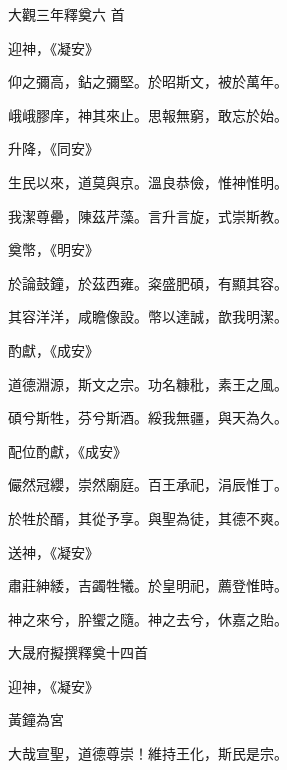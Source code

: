 \begin{pinyinscope}
 大觀三年釋奠六
 首



 迎神，《凝安》



 仰之彌高，鉆之彌堅。於昭斯文，被於萬年。



 峨峨膠庠，神其來止。思報無窮，敢忘於始。



 升降，《同安》



 生民以來，道莫與京。溫良恭儉，惟神惟明。



 我潔尊罍，陳茲芹藻。言升言旋，式崇斯教。



 奠幣，《明安》



 於論鼓鐘，於茲西雍。粢盛肥碩，有顯其容。



 其容洋洋，咸瞻像設。幣以達誠，歆我明潔。



 酌獻，《成安》



 道德淵源，斯文之宗。功名糠秕，素王之風。



 碩兮斯牲，芬兮斯酒。綏我無疆，與天為久。



 配位酌獻，《成安》



 儼然冠纓，崇然廟庭。百王承祀，涓辰惟丁。



 於牲於醑，其從予享。與聖為徒，其德不爽。



 送神，《凝安》



 肅莊紳緌，吉蠲牲犧。於皇明祀，薦登惟時。



 神之來兮，肸蠁之隨。神之去兮，休嘉之貽。



 大晟府擬撰釋奠十四首



 迎神，《凝安》



 黃鐘為宮



 大哉宣聖，道德尊崇！維持王化，斯民是宗。




\end{pinyinscope}
